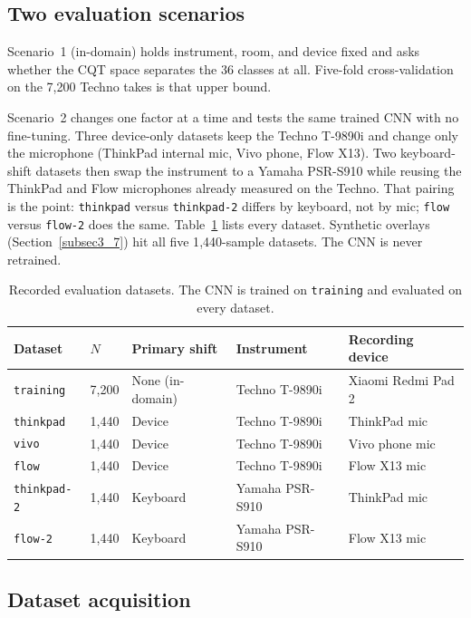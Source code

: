 \documentclass[pdflatex,sn-mathphys-num,iicol]{sn-jnl}
\theoremstyle{thmstyleone}
\theoremstyle{thmstyletwo}
\theoremstyle{thmstylethree}
\begin{document}
\subsection{Two evaluation scenarios}\label{subsec3_0}

Scenario~1 (in-domain) holds instrument, room, and device fixed and asks whether the CQT space separates the 36 classes at all. Five-fold cross-validation on the 7{,}200 Techno takes is that upper bound.

Scenario~2 changes one factor at a time and tests the same trained CNN with no fine-tuning. Three device-only datasets keep the Techno T-9890i and change only the microphone (ThinkPad internal mic, Vivo phone, Flow X13). Two keyboard-shift datasets then swap the instrument to a Yamaha PSR-S910 while reusing the ThinkPad and Flow microphones already measured on the Techno. That pairing is the point: \texttt{thinkpad} versus \texttt{thinkpad-2} differs by keyboard, not by mic; \texttt{flow} versus \texttt{flow-2} does the same. Table~\ref{tab:scenarios} lists every dataset. Synthetic overlays (Section~\ref{subsec3_7}) hit all five 1{,}440-sample datasets. The CNN is never retrained.

\begin{table}[t]
\caption{Recorded evaluation datasets. The CNN is trained on \texttt{training} and evaluated on every dataset.}\label{tab:scenarios}
\begin{tabular*}{\textwidth}{@{\extracolsep{\fill}}lllll@{}}
\toprule
Dataset & $N$ & Primary shift & Instrument & Recording device \\
\midrule
\texttt{training} & 7{,}200 & None (in-domain) & Techno T-9890i & Xiaomi Redmi Pad 2 \\
\texttt{thinkpad} & 1{,}440 & Device & Techno T-9890i & ThinkPad mic \\
\texttt{vivo} & 1{,}440 & Device & Techno T-9890i & Vivo phone mic \\
\texttt{flow} & 1{,}440 & Device & Techno T-9890i & Flow X13 mic \\
\texttt{thinkpad-2} & 1{,}440 & Keyboard & Yamaha PSR-S910 & ThinkPad mic \\
\texttt{flow-2} & 1{,}440 & Keyboard & Yamaha PSR-S910 & Flow X13 mic \\
\bottomrule
\end{tabular*}
\end{table}

\subsection{Dataset acquisition}\label{subsec3_1}
\end{document}

